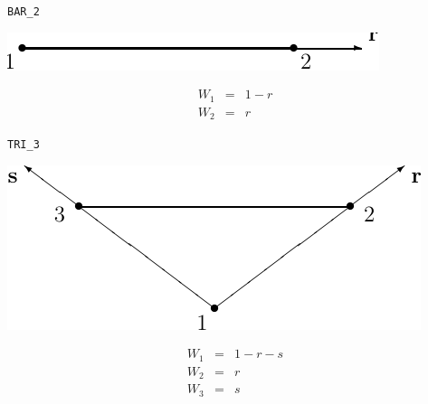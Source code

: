 \vspace{\baselineskip}
\texttt{BAR\_2}\\[-2\baselineskip]
\begin{center}
\begin{minipage}[t]{0.5\linewidth}
   \centering
   \vspace{0pt}
   \includegraphics{cnct.figs/cnct_unst_bar2}
\end{minipage}%
\begin{minipage}[t]{0.5\linewidth}
   \vspace{-\abovedisplayskip}
   \begin{eqnarray*}
      W_1 &=& 1-r \\
      W_2 &=& r
   \end{eqnarray*}
\end{minipage}
\end{center}

\newpage
\texttt{TRI\_3}\\[-2\baselineskip]
\begin{center}
\begin{minipage}[t]{0.5\linewidth}
   \centering
   \vspace{0pt}
   \includegraphics{cnct.figs/cnct_unst_tri3}
\end{minipage}%
\begin{minipage}[t]{0.5\linewidth}
   \vspace{-\abovedisplayskip}
   \begin{eqnarray*}
      W_1 &=& 1-r-s \\
      W_2 &=& r \\
      W_3 &=& s
   \end{eqnarray*}
\end{minipage}
\end{center}

